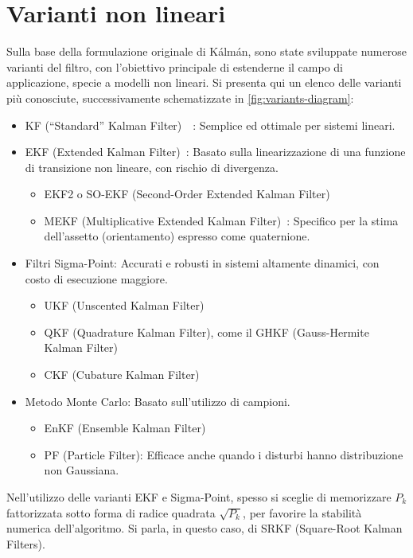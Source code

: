 \documentclass[12pt,a4paper,openright,twoside]{book}
\begin{document}
\section{Varianti non lineari}

Sulla base della formulazione originale di Kálmán, sono state sviluppate numerose varianti del filtro, con l'obiettivo principale di estenderne il campo di applicazione, specie a modelli non lineari. Si presenta qui un elenco delle varianti più conosciute, successivamente schematizzate in \cref{fig:variants-diagram}:
\begin{itemize}
\item KF (``Standard'' Kalman Filter)~\cite{10.1115/1.3662552}~\cite{WelchB95}: Semplice ed ottimale per sistemi lineari.
\item EKF (Extended Kalman Filter)~\cite{WelchB95}: Basato sulla linearizzazione di una funzione di transizione non lineare, con rischio di divergenza.
\begin{itemize}
\item EKF2 o SO-EKF (Second-Order Extended Kalman Filter)~\cite[pp.~191-192]{10.5555/2823801}
\item MEKF (Multiplicative Extended Kalman Filter)~\cite{markley2004}: Specifico per la stima dell'assetto (orientamento) espresso come quaternione.
\end{itemize}
\item Filtri Sigma-Point: Accurati e robusti in sistemi altamente dinamici, con costo di esecuzione maggiore.
\begin{itemize}
\item UKF (Unscented Kalman Filter)~\cite{882463}
\item QKF (Quadrature Kalman Filter), come il GHKF (Gauss-Hermite Kalman Filter)
\item CKF (Cubature Kalman Filter)
\end{itemize}
\item Metodo Monte Carlo: Basato sull'utilizzo di campioni.
\begin{itemize}
\item EnKF (Ensemble Kalman Filter)
\item PF (Particle Filter): Efficace anche quando i disturbi hanno distribuzione non Gaussiana.
\end{itemize}
\end{itemize}

Nell'utilizzo delle varianti EKF e Sigma-Point, spesso si sceglie di memorizzare $P_k$ fattorizzata sotto forma di radice quadrata $\sqrt{P_k}$, per favorire la stabilità numerica dell'algoritmo. Si parla, in questo caso, di SRKF (Square-Root Kalman Filters). \pagebreak
\end{document}
